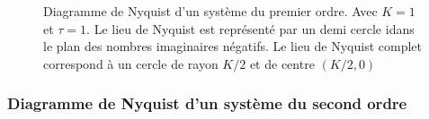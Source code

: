 \begin{figure}[!h]
\begin{center}
\end{center}
\caption{Diagramme de Nyquist d'un système du premier ordre. 
    Avec $K=1$ et $\tau=1$. Le lieu de Nyquist 
    est représenté par un demi cercle idans le plan des nombres 
    imaginaires négatifs. Le lieu de Nyquist complet correspond à un cercle de rayon $K/2$ et de centre $(K/2,0)$ 
    \label{fig-nyquist_1er}}
\end{figure}


\newpage

\subsubsection{Diagramme de Nyquist d'un système du second ordre}

